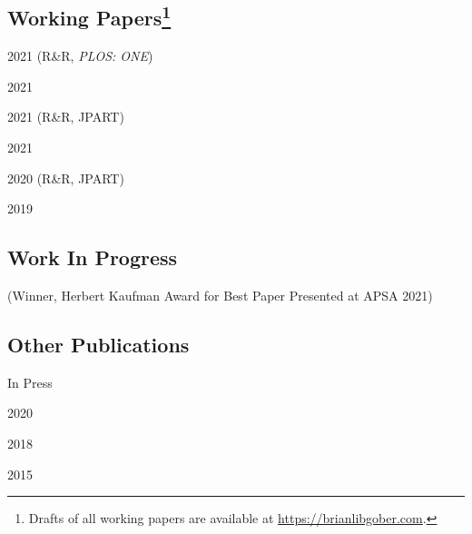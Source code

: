 \documentclass[12pt,letterpaper]{report}
\begin{document}
    \subsection*{Working Papers\footnote[2]{Drafts of all working papers are available at \href{https://brianlibgober.com}{https://brianlibgober.com}.}}
    \begin{tablist}
	\item[2021] \tab{} (R\&R, \textit{PLOS: ONE})
    \item[2021] \tab{} 
    \item[2021] \tab{} (R\&R, JPART)
    \item[2021] \tab{}
    \item[2020] \tab{}  (R\&R, JPART) %
    \item[2019] \tab{}
    \end{tablist}
    
    \subsection*{Work In Progress}
    
    \begin{tablist}
    \item[\the\year] \tab{}
    \item[\the\year] \tab{} (Winner, Herbert Kaufman Award for Best Paper Presented at APSA 2021)
    \item[\the\year] \tab{}
    \item[\the\year] \tab{}
    \end{tablist}

    \subsection*{Other Publications}
    \begin{tablist}
    \item[In Press]     \tab{}
    \item[2020] \tab{}
    \item[2018] \tab{}
    \item[2015] \tab{}
    \end{tablist}
    
\end{document}
